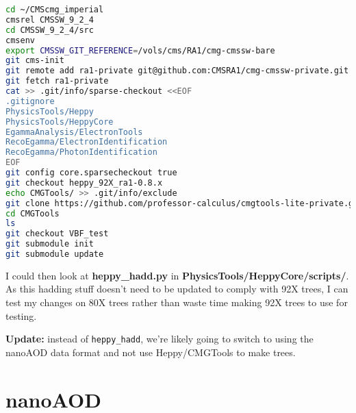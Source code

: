 \begin{lstlisting}[belowskip=-0.7cm, language=sh]
cd ~/CMScmg_imperial
cmsrel CMSSW_9_2_4
cd CMSSW_9_2_4/src
cmsenv
export CMSSW_GIT_REFERENCE=/vols/cms/RA1/cmg-cmssw-bare
git cms-init
git remote add ra1-private git@github.com:CMSRA1/cmg-cmssw-private.git
git fetch ra1-private
cat >> .git/info/sparse-checkout <<EOF
.gitignore
PhysicsTools/Heppy
PhysicsTools/HeppyCore
EgammaAnalysis/ElectronTools
RecoEgamma/ElectronIdentification
RecoEgamma/PhotonIdentification
EOF
git config core.sparsecheckout true
git checkout heppy_92X_ra1-0.8.x
echo CMGTools/ >> .git/info/exclude
git clone https://github.com/professor-calculus/cmgtools-lite-private.git CMGTools
cd CMGTools
ls
git checkout VBF_test
git submodule init
git submodule update
\end{lstlisting}

I could then look at \textbf{heppy\_hadd.py} in \textbf{PhysicsTools/HeppyCore/scripts/}. As this hadding stuff doesn't need to be updated to comply with 92X trees, I can test my changes on 80X trees rather than waste time making 92X trees to use for testing.

\textbf{Update:} instead of \texttt{heppy\_hadd}, we're likely going to switch to using the nanoAOD data format and not use Heppy/CMGTools to make trees.


\section{nanoAOD}
